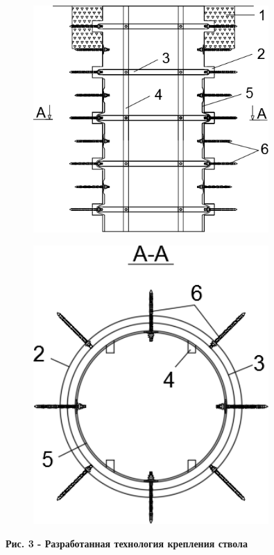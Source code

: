 \begin{figure}[H]
	\centering
	\includegraphics[width=0.8\textwidth]{assets/1131}
	\caption*{}
\end{figure}
\begin{figure}[H]
	\centering
	\includegraphics[width=0.8\textwidth]{assets/1132}
	\caption*{}
\end{figure}

{\bfseries Рис. 3 - Разработанная технология крепления ствола}

